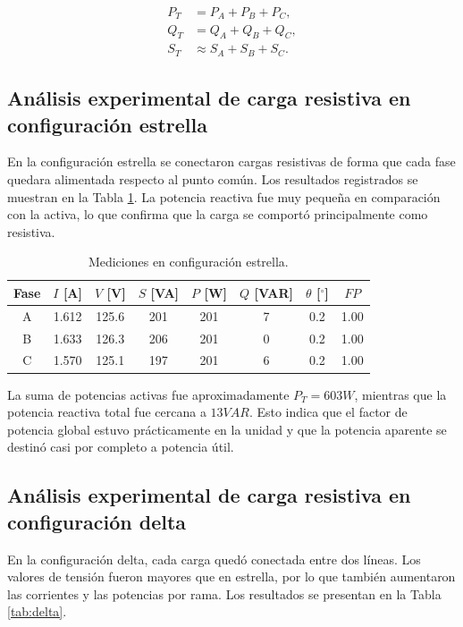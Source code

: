 	\begin{align}
		P_T &= P_A+P_B+P_C,\\
		Q_T &= Q_A+Q_B+Q_C,\\
		S_T &\approx S_A+S_B+S_C.
	\end{align}
	
	\subsection{Análisis experimental de carga resistiva en configuración estrella}
	
	En la configuración estrella se conectaron cargas resistivas de forma que cada fase quedara alimentada respecto al punto común. Los resultados registrados se muestran en la Tabla \ref{tab:estrella}. La potencia reactiva fue muy pequeña en comparación con la activa, lo que confirma que la carga se comportó principalmente como resistiva.
	
	\begin{table}[H]
		\centering
		\caption{Mediciones en configuración estrella.}
		\label{tab:estrella}
		
			\begin{tabular}{c c c c c c c c}
				\toprule
				Fase & \(I\) [A] & \(V\) [V] & \(S\) [VA] & \(P\) [W] & \(Q\) [VAR] & \(\theta\) [\(^\circ\)] & \(FP\) \\
				\midrule
				A & 1.612 & 125.6 & 201 & 201 & 7 & 0.2 & 1.00 \\
				B & 1.633 & 126.3 & 206 & 201 & 0 & 0.2 & 1.00 \\
				C & 1.570 & 125.1 & 197 & 201 & 6 & 0.2 & 1.00 \\
				\bottomrule
		\end{tabular}
	\end{table}
	
	La suma de potencias activas fue aproximadamente \(P_T=603\unit{W}\), mientras que la potencia reactiva total fue cercana a \(13\unit{VAR}\). Esto indica que el factor de potencia global estuvo prácticamente en la unidad y que la potencia aparente se destinó casi por completo a potencia útil.
	
	\subsection{Análisis experimental de carga resistiva en configuración delta}
	
	En la configuración delta, cada carga quedó conectada entre dos líneas. Los valores de tensión fueron mayores que en estrella, por lo que también aumentaron las corrientes y las potencias por rama. Los resultados se presentan en la Tabla \ref{tab:delta}.
	
